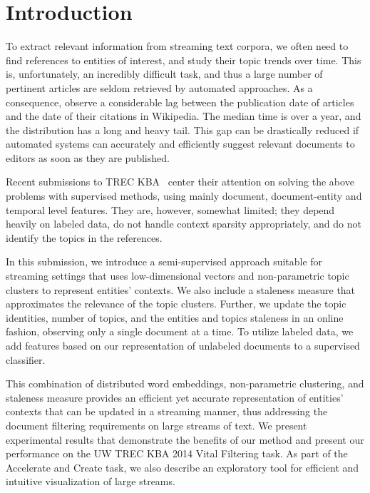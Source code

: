 \documentclass{article}
\begin{document}
\section{Introduction}
\label{intro}

To extract relevant information from streaming text corpora, we often need to find references to entities of interest, and study their topic trends over time. 
This is, unfortunately, an incredibly difficult task, and thus a large number of pertinent articles are seldom retrieved by automated approaches.
As a consequence, \citet{frank12} observe a considerable lag between the publication date of articles and the date of their citations in Wikipedia.
The median time is over a year, and the distribution has a long and heavy tail. 
This gap can be drastically reduced if automated systems can accurately and efficiently suggest relevant documents to editors as soon as they are published.

Recent submissions to TREC KBA~\cite{xitong13, bouvier13, efron13, zhang13, bellogin13} center their attention on solving the above problems with supervised methods, using mainly document, document-entity and temporal level features.
They are, however, somewhat limited; they depend heavily on labeled data, do not handle context sparsity appropriately, and do not identify the topics in the references. %


In this submission, we introduce a semi-supervised approach suitable for streaming settings that uses low-dimensional vectors and non-parametric topic clusters to represent entities' contexts. We also include a staleness measure that approximates the relevance of the topic clusters. %
Further, we update the topic identities, number of topics, and the entities and topics staleness in an online fashion, observing only a single document at a time.
To utilize labeled data, we add features based on our representation of unlabeled documents to a supervised classifier.

This combination of distributed word embeddings, non-parametric clustering, and staleness measure provides an efficient yet accurate representation of entities' contexts that can be updated in a streaming manner, thus addressing the document filtering requirements on large streams of text.
We present experimental results that demonstrate the benefits of our method and present our performance on the UW TREC KBA 2014 Vital Filtering task.
As part of the Accelerate and Create task, we also describe an exploratory tool for efficient and intuitive visualization of large streams.
\end{document}
